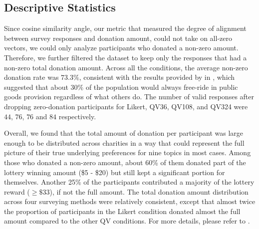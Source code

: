 \subsection{Descriptive Statistics}


Since cosine similarity angle, our metric that measured the degree of alignment between survey responses and donation amount, could not take on all-zero vectors, we could only analyze participants who donated a non-zero amount. Therefore, we further filtered the dataset to keep only the responses that had a non-zero total donation amount. Across all the conditions, the average non-zero donation rate was $73.3\%$, consistent with the results provided by \textcite{fehr2007human} in \citeyear{fehr2007human}, which suggested that about $30\%$ of the population would always free-ride in public goods provision regardless of what others do. The number of valid responses after dropping zero-donation participants for Likert, QV36, QV108, and QV324 were $44$, $76$, $76$ and $84$ respectively.

Overall, we found that the total amount of donation per participant was large enough to be distributed across charities in a way that could represent the full picture of 
their true underlying preferences for nine topics in most cases. Among those who donated a non-zero amount, about 60\% of them donated part of the lottery winning amount (\$5 - \$20) but still kept a significant portion for themselves. Another 25\% of the participants contributed a majority of the lottery reward ($\geq \$33$), if not the full amount. The total donation amount distribution across four surveying methods were relatively consistent, except that almost twice the proportion of participants in the Likert condition donated almost the full amount compared to the other QV conditions. For more details, please refer to .



